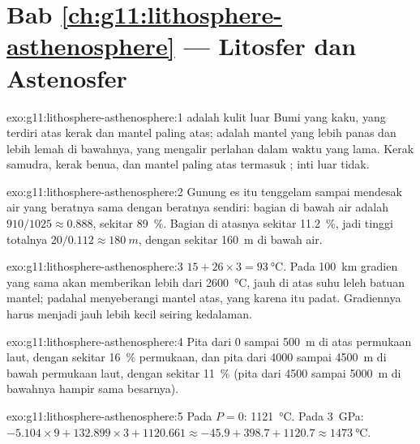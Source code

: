 \section*{Bab \ref{ch:g11:lithosphere-asthenosphere} --- Litosfer dan Astenosfer}

\begin{solution}{exo:g11:lithosphere-asthenosphere:1}
 adalah kulit luar Bumi yang kaku, yang terdiri atas kerak dan mantel
paling atas;  adalah mantel yang lebih panas dan lebih lemah di
bawahnya, yang mengalir perlahan dalam waktu yang lama. Kerak samudra, kerak
benua, dan mantel paling atas termasuk ; inti luar tidak.
\end{solution}

\begin{solution}{exo:g11:lithosphere-asthenosphere:2}
Gunung es itu tenggelam sampai mendesak air yang beratnya sama dengan beratnya
sendiri: bagian di bawah air adalah $910/1025 \approx 0.888$, sekitar
\qty{89}{\percent}. Bagian di atasnya sekitar \qty{11.2}{\percent}, jadi tinggi
totalnya $20/0.112 \approx \qty{180}{m}$, dengan sekitar \qty{160}{m} di bawah
air.
\end{solution}

\begin{solution}{exo:g11:lithosphere-asthenosphere:3}
$15 + 26 \times 3 = \qty{93}{\celsius}$. Pada \qty{100}{km} gradien yang sama
akan memberikan lebih dari \qty{2600}{\celsius}, jauh di atas suhu leleh batuan
mantel; padahal  menyeberangi mantel atas, yang karena itu padat.
Gradiennya harus menjadi jauh lebih kecil seiring kedalaman.
\end{solution}

\begin{solution}{exo:g11:lithosphere-asthenosphere:4}
Pita dari 0 sampai \qty{500}{m} di atas permukaan laut, dengan sekitar
\qty{16}{\percent} permukaan, dan pita dari 4000 sampai \qty{4500}{m} di bawah
permukaan laut, dengan sekitar \qty{11}{\percent} (pita dari 4500 sampai
\qty{5000}{m} di bawahnya hampir sama besarnya).
\end{solution}

\begin{solution}{exo:g11:lithosphere-asthenosphere:5}
Pada $P = 0$: \qty{1121}{\celsius}. Pada \qty{3}{GPa}: $-5.104 \times 9 +
132.899 \times 3 + 1120.661 \approx -45.9 + 398.7 + 1120.7 \approx
\qty{1473}{\celsius}$.
\end{solution}

